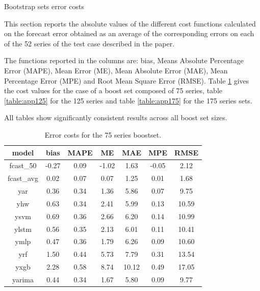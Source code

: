 \documentclass[ijoc,sglanonrev]{informs4}
\begin{document}
%
\begin{APPENDIX}{Bootstrap sets error costs} \label{app:errcost}
\clearpage %

This section reports the absolute values of the different cost functions calculated on the forecast error obtained as an average of the corresponding errors on each of the 52 series of the test case described in the paper.

The functions reported in the columns are: bias, Means Absolute Percentage Error (MAPE), Mean Error (ME), Mean Absolute Error (MAE), Mean Percentage Error (MPE) and Root Mean Square Error (RMSE). Table \ref{table:app75} gives the cost values for the case of a boost set composed of 75 series, table \ref{table:app125} for the 125 series and table \ref{table:app175} for the 175 series sets.

All tables show significantly consistent results across all boost set sizes.

\begin{table}[h]
\centering
\renewcommand{\arraystretch}{0.75}
\begin{tabular}{ccccccc}
model & bias & MAPE & ME & MAE & MPE & RMSE \\
\hline
fcast\_50   &-0.27 & 0.09 &-1.02 & 1.63 &-0.05 &  2.12 \\
fcast\_avg  & 0.02 & 0.07 & 0.07 & 1.25 & 0.01 &  1.68 \\
yar         & 0.36 & 0.34 & 1.36 & 5.86 & 0.07 &  9.75 \\
yhw         & 0.63 & 0.34 & 2.41 & 5.99 & 0.13 & 10.59 \\
ysvm        & 0.69 & 0.36 & 2.66 & 6.20 & 0.14 & 10.99 \\
ylstm       & 0.56 & 0.35 & 2.13 & 6.01 & 0.11 & 10.41 \\
ymlp        & 0.47 & 0.36 & 1.79 & 6.26 & 0.09 & 10.60 \\
yrf         & 1.50 & 0.44 & 5.73 & 7.79 & 0.31 & 13.54 \\
yxgb        & 2.28 & 0.58 & 8.74 &10.12 & 0.49 & 17.05 \\
yarima      & 0.44 & 0.34 & 1.67 & 5.80 & 0.09 &  9.77 \\
\hline
\end{tabular}
\caption{Error costs for the 75 series boostset.}
\label{table:app75}
\end{table}


\end{APPENDIX}
\end{document}
